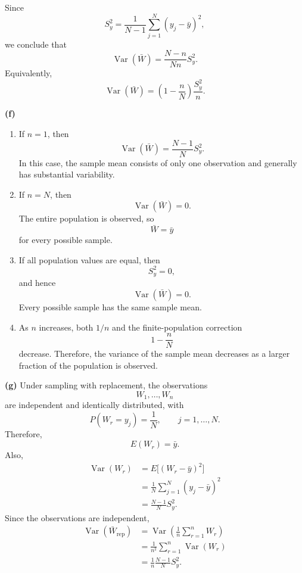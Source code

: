 \documentclass[11pt]{article}
\begin{document}
\begin{solutionbox}
Since
\[
S_y^2
=
\frac{1}{N-1}
\sum_{j=1}^N (y_j-\bar y)^2,
\]
we conclude that
\[
\operatorname{Var}(\bar W)
=
\frac{N-n}{Nn}S_y^2.
\]
Equivalently,
\[
\operatorname{Var}(\bar W)
=
\left(1-\frac{n}{N}\right)\frac{S_y^2}{n}.
\]
 

\textbf{(f)}

\begin{enumerate}[label=(\roman*), leftmargin=2em]

\item If \(n=1\), then
\[
\operatorname{Var}(\bar W)
=
\frac{N-1}{N}S_y^2.
\]
In this case, the sample mean consists of only one observation and generally
has substantial variability.

\item If \(n=N\), then
\[
\operatorname{Var}(\bar W)=0.
\]
The entire population is observed, so
\[
\bar W=\bar y
\]
for every possible sample.

\item If all population values are equal, then
\[
S_y^2=0,
\]
and hence
\[
\operatorname{Var}(\bar W)=0.
\]
Every possible sample has the same sample mean.

\item As \(n\) increases, both \(1/n\) and the finite-population correction
\[
1-\frac{n}{N}
\]
decrease. Therefore, the variance of the sample mean decreases as a larger
fraction of the population is observed.

\end{enumerate}

\medskip

\textbf{(g)}
Under sampling with replacement, the observations
\[
W_1,\dots,W_n
\]
are independent and identically distributed, with
\[
P(W_r=y_j)=\frac{1}{N},
\qquad j=1,\dots,N.
\]
Therefore,
\[
E(W_r)=\bar y.
\]
Also,
\begin{align*}
\operatorname{Var}(W_r)
&=
E\bigl[(W_r-\bar y)^2\bigr]\\
&=
\frac{1}{N}\sum_{j=1}^N (y_j-\bar y)^2\\
&=
\frac{N-1}{N}S_y^2.
\end{align*}
Since the observations are independent,
\begin{align*}
\operatorname{Var}(\bar W_{\mathrm{rep}})
&=
\operatorname{Var}\left(
\frac{1}{n}\sum_{r=1}^n W_r
\right)\\
&=
\frac{1}{n^2}
\sum_{r=1}^n\operatorname{Var}(W_r)\\
&=
\frac{1}{n}\frac{N-1}{N}S_y^2.
\end{align*}


\end{solutionbox}
\end{document}
